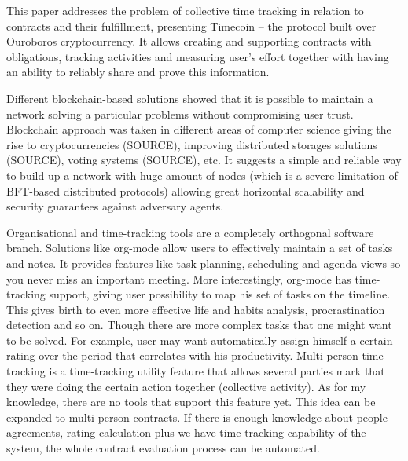 \documentclass[]{itmo-student-thesis}
\begin{document}

\tableofcontents

\startprefacepage

This paper addresses the problem of collective time tracking in
relation to contracts and their fulfillment, presenting Timecoin --
the protocol built over Ouroboros cryptocurrency. It allows creating
and supporting contracts with obligations, tracking activities and
measuring user’s effort together with having an ability to reliably
share and prove this information.

Different blockchain-based solutions showed that it is possible to
maintain a network solving a particular problems without compromising
user trust. Blockchain approach was taken in different areas of
computer science giving the rise to cryptocurrencies (SOURCE),
improving distributed storages solutions (SOURCE), voting systems
(SOURCE), etc. It suggests a simple and reliable way to build up a
network with huge amount of nodes (which is a severe limitation of
BFT-based distributed protocols) allowing great horizontal scalability
and security guarantees against adversary agents.

Organisational and time-tracking tools are a completely orthogonal
software branch. Solutions like org-mode allow users to effectively
maintain a set of tasks and notes. It provides features like task
planning, scheduling and agenda views so you never miss an important
meeting. More interestingly, org-mode has time-tracking support,
giving user possibility to map his set of tasks on the timeline. This
gives birth to even more effective life and habits analysis,
procrastination detection and so on. Though there are more complex
tasks that one might want to be solved. For example, user may want
automatically assign himself a certain rating over the period that
correlates with his productivity. Multi-person time tracking is a
time-tracking utility feature that allows several parties mark that
they were doing the certain action together (collective activity). As
for my knowledge, there are no tools that support this feature
yet. This idea can be expanded to multi-person contracts. If there is
enough knowledge about people agreements, rating calculation plus we
have time-tracking capability of the system, the whole contract
evaluation process can be automated.
\end{document}
